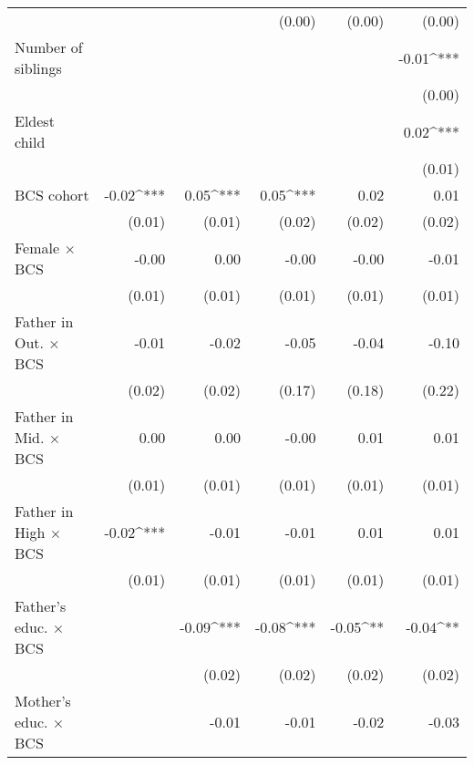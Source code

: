 \begin{tabular}{l D{.}{.}{5.5} D{.}{.}{5.5} D{.}{.}{5.5} D{.}{.}{5.5} D{.}{.}{5.5}}
                                 &             &             & (0.00)      & (0.00)     & (0.00)      \\
Number of siblings               &             &             &             &            & -0.01^{***} \\
                                 &             &             &             &            & (0.00)      \\
Eldest child                     &             &             &             &            & 0.02^{***}  \\
                                 &             &             &             &            & (0.01)      \\
BCS cohort                       & -0.02^{***} & 0.05^{***}  & 0.05^{***}  & 0.02       & 0.01        \\
                                 & (0.01)      & (0.01)      & (0.02)      & (0.02)     & (0.02)      \\
Female $\times$ BCS              & -0.00       & 0.00        & -0.00       & -0.00      & -0.01       \\
                                 & (0.01)      & (0.01)      & (0.01)      & (0.01)     & (0.01)      \\
Father in Out. $\times$ BCS      & -0.01       & -0.02       & -0.05       & -0.04      & -0.10       \\
                                 & (0.02)      & (0.02)      & (0.17)      & (0.18)     & (0.22)      \\
Father in Mid. $\times$ BCS      & 0.00        & 0.00        & -0.00       & 0.01       & 0.01        \\
                                 & (0.01)      & (0.01)      & (0.01)      & (0.01)     & (0.01)      \\
Father in High $\times$ BCS      & -0.02^{***} & -0.01       & -0.01       & 0.01       & 0.01        \\
                                 & (0.01)      & (0.01)      & (0.01)      & (0.01)     & (0.01)      \\
Father's educ. $\times$ BCS      &             & -0.09^{***} & -0.08^{***} & -0.05^{**} & -0.04^{**}  \\
                                 &             & (0.02)      & (0.02)      & (0.02)     & (0.02)      \\
Mother's educ. $\times$ BCS      &             & -0.01       & -0.01       & -0.02      & -0.03       \\

\end{tabular}
